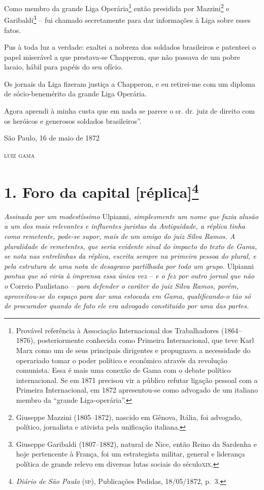 {\begin{flushright}
Como membro da grande Liga Operária\footnote{ Provável referência à
  Associação Internacional dos Trabalhadores (1864--1876), posteriormente
  conhecida como Primeira Internacional, que teve Karl Marx como um de
  seus principais dirigentes e propugnava a necessidade do operariado
  tomar o poder político e econômico através da revolução comunista.
  Essa é mais uma conexão de Gama com o debate político internacional.
  Se em 1871 precisou vir a público refutar ligação pessoal com a
  Primeira Internacional, em 1872 apresentou-se como advogado de um
  italiano membro da ``grande Liga-operária''.} então presidida por
Mazzini\footnote{ Giuseppe Mazzini (1805--1872), nascido em Gênova,
  Itália, foi advogado, político, jornalista e ativista pela unificação
  italiana.} e Garibaldi\footnote{ Giuseppe Garibaldi (1807--1882),
  natural de Nice, então Reino da Sardenha e hoje pertencente à França,
  foi um estrategista militar, general e liderança política de grande
  relevo em diversas lutas sociais do século\textsc{xix}.} -- fui chamado
secretamente para dar informações à Liga sobre esses fatos.

Pus à toda luz a verdade: exaltei a nobreza dos soldados brasileiros e
patenteei o papel miserável a que prestava-se Chapperon, que não passava
de um pobre lacaio, hábil para papéis do seu ofício.

Os jornais da Liga fizeram justiça a Chapperon, e eu retirei-me com um
diploma de sócio-benemérito da grande Liga Operária.

Agora aprendi à minha custa que em nada se parece o sr. dr. juiz de
direito com os heróicos e generosos soldados brasileiros''.

\begin{flushright}
São Paulo, 16 de maio de 1872

\textsc{luiz gama}
\end{flushright}

\chapter{1. Foro da capital {[}réplica{]}\footnote{\emph{Diário de São Paulo} (\textsc{sp}), Publicações Pedidas,
  18/05/1872, p.~3.}} %

\begin{didascalia}
\emph{Assinada por um modestíssimo} Ulpianni\emph{, simplesmente um nome
que fazia alusão a um dos mais relevantes e influentes juristas da
Antiguidade, a réplica tinha como remetente, pode-se supor, mais de um
amigo do juiz Silva Ramos. A pluralidade de remetentes, que seria
evidente sinal do impacto do texto de Gama, se nota nas entrelinhas da
réplica, escrita sempre na primeira pessoa do plural, e pela estrutura
de uma nota de desagravo partilhada por todo um grupo.} Ulpianni
\emph{pontua que só viria à imprensa essa única vez -- e o fez por outro
jornal que não o} Correio Paulistano \emph{-- para defender o caráter do
juiz Silva Ramos, porém, aproveitou-se do espaço para dar uma estocada
em Gama, qualificando-o tão só de procurador quando de fato ele era
advogado constituído por uma das partes.}
\end{didascalia}


\end{flushright}}
